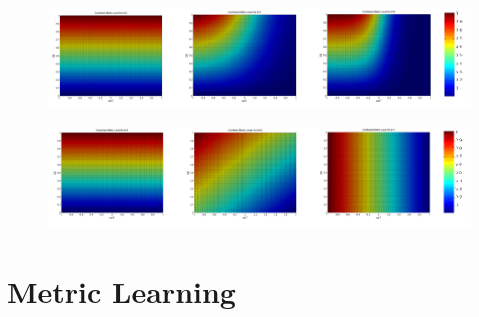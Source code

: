 \begin{figure}
	\centering
	\includegraphics[width=1\linewidth]{images/ContourLine_DSig}
	\caption{}
	\label{fig:ContourLine_DSig}
\end{figure}

\begin{figure}
	\centering
	\includegraphics[width=1\linewidth]{images/ContourLine_DLin}
	\caption{}
	\label{fig:ContourLine_DLin}
\end{figure}




\newpage

\section{Metric Learning}

